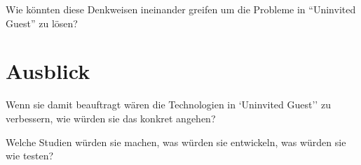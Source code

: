 \documentclass[sigchi-a, authorversion]{acmart}
\begin{document}
Wie könnten diese Denkweisen ineinander greifen um die Probleme in ``Uninvited Guest'' zu lösen?

\section{Ausblick}

Wenn sie damit beauftragt wären die Technologien in `Uninvited Guest'' zu verbessern, wie würden sie das konkret angehen?

Welche Studien würden sie machen, was würden sie entwickeln, was würden sie wie testen?






\end{document}
